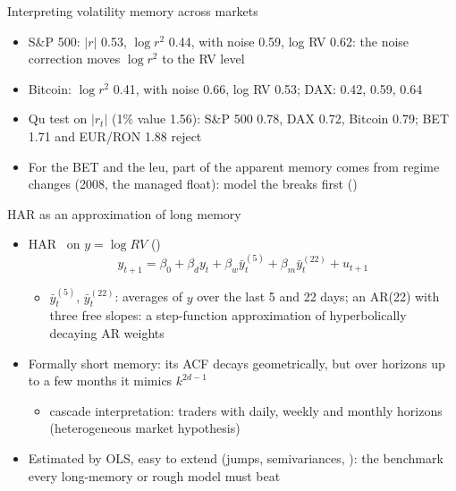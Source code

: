 \begin{frame}{Interpreting volatility memory across markets}
\itemsize{\small}
\begin{itemize}
    \item S\&P 500: $|r|$ 0.53, $\log r^2$ 0.44, with noise 0.59, log RV 0.62: the noise correction moves $\log r^2$ to the RV level
    \item Bitcoin: $\log r^2$ 0.41, with noise 0.66, log RV 0.53; DAX: 0.42, 0.59, 0.64
    \item Qu test on $|r_t|$ (1\% value 1.56): S\&P 500 0.78, DAX 0.72, Bitcoin 0.79; BET 1.71 and EUR/RON 1.88 reject
    \item For the BET and the leu, part of the apparent memory comes from regime changes (2008, the managed float): model the breaks first ()
\end{itemize}
\end{frame}

\begin{frame}{HAR as an approximation of long memory}
\itemsize{\small}
\begin{itemize}
    \item HAR \ on $y = \log RV$ ()
    \[ y_{t+1} = \beta_0 + \beta_dy_t + \beta_w\bar y_t^{(5)} + \beta_m\bar y_t^{(22)} + u_{t+1} \]
    \begin{itemize}
        \item $\bar y_t^{(5)}$, $\bar y_t^{(22)}$: averages of $y$ over the last 5 and 22 days; an AR(22) with three free slopes: a step-function approximation of hyperbolically decaying AR weights
    \end{itemize}
    \item Formally short memory: its ACF decays geometrically, but over horizons up to a few months it mimics $k^{2d-1}$
    \begin{itemize}
        \item cascade interpretation: traders with daily, weekly and monthly horizons (heterogeneous market hypothesis)
    \end{itemize}
    \item Estimated by OLS, easy to extend (jumps, semivariances, ): the benchmark every long-memory or rough model must beat
\end{itemize}
\end{frame}

